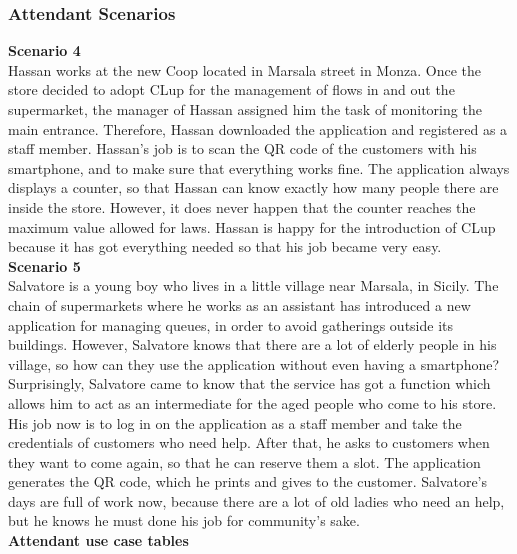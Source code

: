 \documentclass[table, 12pt]{article}
\begin{document}
\subsubsection{Attendant Scenarios}
\textbf{Scenario 4}\\
Hassan works at the new Coop located in Marsala street in Monza. Once the store decided to adopt CLup for the management of flows in and out the supermarket, the manager of Hassan assigned him the task of monitoring the main entrance. Therefore, Hassan downloaded the application and registered as a staff member. Hassan's job is to scan the QR code of the customers with his smartphone, and to make sure that everything works fine. The application always displays a counter, so that Hassan can know exactly how many people there are inside the store. However, it does never happen that the counter reaches the maximum value allowed for laws. Hassan is happy for the introduction of CLup because it has got everything needed so that his job became very easy.\\

\textbf{Scenario 5}\\
Salvatore is a young boy who lives in a little village near Marsala, in Sicily. The chain of supermarkets where he works as an assistant has introduced a new application for managing queues, in order to avoid gatherings outside its buildings. However, Salvatore knows that there are a lot of elderly people in his village, so how can they use the application without even having a smartphone? Surprisingly, Salvatore came to know that the service has got a function which allows him to act as an intermediate for the aged people who come to his store. His job now is to log in on the application as a staff member and take the credentials of customers who need help. After that, he asks to customers when they want to come again, so that he can reserve them a slot. The application generates the QR code, which he prints and gives to the customer. Salvatore's days are full of work now, because there are a lot of old ladies who need an help, but he knows he must done his job for community's sake.\\

\textbf{Attendant use case tables}\\
\end{document}

